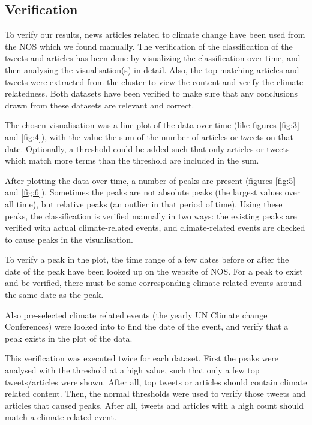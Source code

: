 \documentclass[paper=a4, fontsize=9px]{scrartcl} %
\numberwithin{equation}{section} %
\numberwithin{figure}{section} %
\numberwithin{table}{section} %
\begin{document}
\begin{multicols}{2}
\subsection{Verification}

To verify our results, news articles related to climate change have been used from the NOS which we found manually. The verification of the classification of the tweets and articles has been done by visualizing the classification over time, and then analysing the visualisation(s) in detail. Also, the top matching articles and tweets were extracted from the cluster to view the content and verify the climate-relatedness. Both datasets have been verified to make sure that any conclusions drawn from these datasets are relevant and correct.

The chosen visualisation was a line plot of the data over time (like figures \ref{fig:3} and \ref{fig:4}), with the value the sum of the number of articles or tweets on that date. Optionally, a threshold could be added such that only articles or tweets which match more terms than the threshold are included in the sum.

After plotting the data over time, a number of peaks are present (figures \ref{fig:5} and \ref{fig:6}). Sometimes the peaks are not absolute peaks (the largest values over all time), but relative peaks (an outlier in that period of time). Using these peaks, the classification is verified manually in two ways: the existing peaks are verified with actual climate-related events, and climate-related events are checked to cause peaks in the visualisation.

To verify a peak in the plot, the time range of a few dates before or after the date of the peak have been looked up on the website of NOS. For a peak to exist and be verified, there must be some corresponding climate related events around the same date as the peak.

Also pre-selected climate related events (the yearly UN Climate change Conferences) were looked into to find the date of the event, and verify that a peak exists in the plot of the data. 

This verification was executed twice for each dataset. First the peaks were analysed with the threshold at a high value, such that only a few top tweets/articles were shown. After all, top tweets or articles should contain climate related content. Then, the normal thresholds were used to verify those tweets and articles that caused peaks. After all, tweets and articles with a high count should match a climate related event.




\end{multicols}
\end{document}
